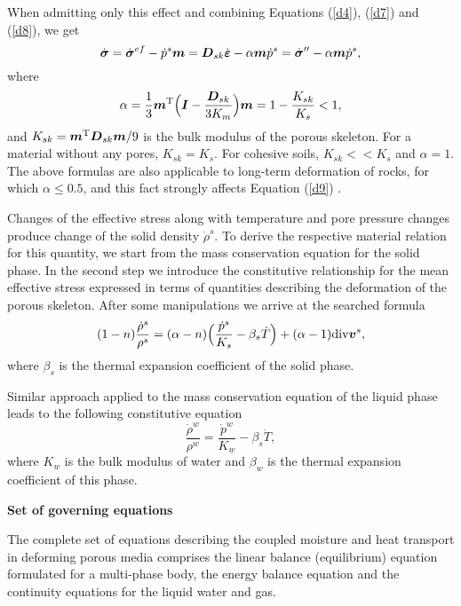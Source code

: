 When admitting only this effect and combining Equations (\ref{d4}), (\ref{d7}) and (\ref{d8}), we get
\begin{equation}\label{d9}
\dot{\mbox{\boldmath$\sigma$}} = \dot{\mbox{\boldmath$\sigma$}}^{ef} - \dot{p}^s \mbox{\boldmath$m$} = \mbox{\boldmath$D$}_{sk} \dot{\mbox{\boldmath$\varepsilon$}}
- \alpha \mbox{\boldmath$m$} \dot{p}^s = \dot{\mbox{\boldmath$\sigma$}}'' - \alpha \mbox{\boldmath$m$} \dot{p}^s,
\end{equation}
where
\begin{equation}\label{d10}
\alpha = \frac{1}{3} \mbox{\boldmath$m$}^{\rm T} \Big( \mbox{\boldmath$I$} - \frac{\mbox{\boldmath$D$}_{sk}}{3K_m} \Big) \mbox{\boldmath$m$} = 1 - 
\frac{K_{sk}}{K_s} < 1,
\end{equation}
and $K_{sk} = \mbox{\boldmath$m$}^{\rm T} \mbox{\boldmath$D$}_{sk} \mbox{\boldmath$m$}/9$ is the bulk modulus of the porous skeleton. 
For a material without any pores, $K_{sk} = K_s$. For cohesive soils, $K_{sk} << K_s$ and $\alpha = 1$. 
The above formulas are also applicable to long-term deformation of rocks, for which  $\alpha \leq 0.5$, 
and this fact strongly affects Equation (\ref{d9}) \cite{zienkiewicz83}.

Changes of the effective stress along with temperature and pore pressure changes produce change of the solid density 
$\dot{\rho}^s$. To derive the respective material relation for this quantity, we start from the mass conservation equation 
for the solid phase. In the second step we introduce the constitutive relationship for the mean effective stress expressed 
in terms of quantities describing the deformation of the porous skeleton. After some manipulations we arrive at the 
searched formula
\begin{equation}\label{d15}
(1 - n)\frac {\dot{\rho}^s}{\rho^s} = (\alpha - n)\Big(\frac {\dot{p}^s}{K_s} - \beta_s \dot{T}\Big) + 
(\alpha - 1){\rm div} \mbox{\boldmath$v$}^s,
\end{equation}
where $\beta_s$ is the thermal expansion coefficient of the solid phase.

Similar approach applied to the mass conservation equation of the liquid phase leads to the following constitutive equation
\begin{equation}\label{d16}
\frac {\dot{\rho}^w}{\rho^w} = \frac {\dot{p}^w}{K_w} - \beta_s \dot{T},
\end{equation}
where $K_w$ is the bulk modulus of water and $\beta_w$ is the thermal expansion coefficient of this phase.

{\bf Set of governing equations}

The complete set of equations describing the coupled moisture and heat transport in deforming porous media comprises 
the linear balance (equilibrium) equation formulated for a multi-phase body, the energy balance equation and 
the continuity equations for the liquid water and gas.

